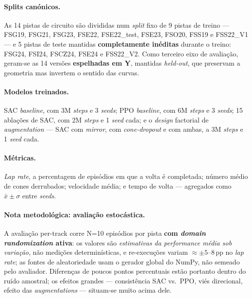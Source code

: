 \documentclass[runningheads]{llncs}
\begin{document}
\paragraph{Splits canónicos.} As 14 pistas de circuito são divididas num \textit{split} fixo de 9 pistas de treino --- FSG19, FSG21, FSG23, FSE22, FSE22\_test, FSE23, FSO20, FSS19 e FSS22\_V1 --- e 5 pistas de teste mantidas \textbf{completamente inéditas} durante o treino: FSG24, FSI24, FSCZ24, FSE24 e FSS22\_V2. Como terceiro eixo de avaliação, geram-se as 14 versões \textbf{espelhadas em Y}, mantidas \textit{held-out}, que preservam a geometria mas invertem o sentido das curvas.

\paragraph{Modelos treinados.} SAC \textit{baseline}, com 3M \textit{steps} e 3 \textit{seeds}; PPO \textit{baseline}, com 6M \textit{steps} e 3 \textit{seeds}; 15 ablações de SAC, com 2M \textit{steps} e 1 \textit{seed} cada; e o \textit{design} factorial de \textit{augmentation} --- SAC com \textit{mirror}, com \textit{cone-dropout} e com ambas, a 3M \textit{steps} e 1 \textit{seed} cada.

\paragraph{Métricas.} \textit{Lap rate}, a percentagem de episódios em que a volta é completada; número médio de cones derrubados; velocidade média; e tempo de volta --- agregados como $\bar{x}\pm\sigma$ entre \textit{seeds}.

\paragraph{Nota metodológica: avaliação estocástica.}
A avaliação per-track corre N=10 episódios por pista \textbf{com \textit{domain randomization} ativa}: os valores são \emph{estimativas da performance média sob variação}, não medições determinísticas, e re-execuções variam $\approx\pm5$--$8$\,pp no \textit{lap rate}; as fontes de aleatoriedade usam o gerador global do NumPy, não semeado pelo avaliador. Diferenças de poucos pontos percentuais estão portanto dentro do ruído amostral; os efeitos grandes --- consistência SAC vs.\ PPO, viés direcional, efeito das \textit{augmentations} --- situam-se muito acima dele.

\end{document}
